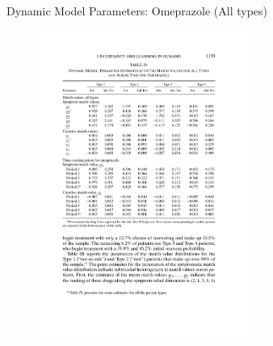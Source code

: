 \documentclass[xcolor=pdftex,dvipsnames,table,mathserif,aspectratio=169]{beamer}
\begin{document}
\begin{frame}{Dynamic Model Parameters: Omeprazole (All types)}
\begin{figure}[htbp]
\begin{center}
\includegraphics[width=7cm]{resources/crawfordshumparam2.pdf}
\label{default}
\end{center}
\end{figure}
\end{frame}
\end{document}

